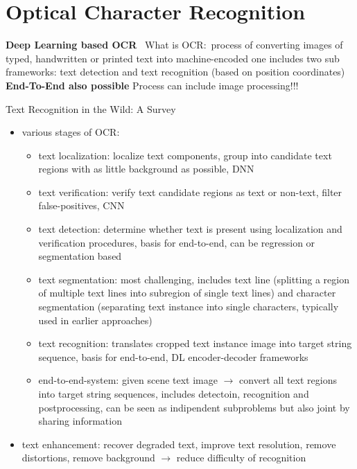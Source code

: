 \section{Optical Character Recognition}

\textbf{Deep Learning based OCR}~\citep{zhao_improving_2020}
What is OCR:\ process of converting images of typed, handwritten or printed text into machine-encoded one
includes two sub frameworks: text detection and text recognition (based on position coordinates)
\textbf{End-To-End also possible}
Process can include image processing!!!

Text Recognition in the Wild: A Survey~\citep{chen_text_2021}
\begin{itemize}
    \item various stages of \ac{OCR}:
        \begin{itemize}
            \item text localization: localize text components, group into candidate text regions with
                as little background as possible, DNN
            \item text verification: verify text candidate regions as text or non-text,
                filter false-positives, CNN
            \item text detection: determine whether text is present using localization and verification
                procedures, basis for end-to-end, can be regression or segmentation based
            \item text segmentation: most challenging, includes text line (splitting a region of multiple
                text lines into subregion of single text lines) and character segmentation (separating
                text instance into single characters, typically used in earlier approaches)
            \item text recognition: translates cropped text instance image into target string sequence,
                basis for end-to-end, DL encoder-decoder frameworks
            \item end-to-end-system: given scene text image $\rightarrow$ convert all text regions into
                target string sequences, includes detectoin, recognition and postprocessing, can be
                seen as indipendent subproblems but also joint by sharing information
        \end{itemize}
    \item text enhancement: recover degraded text, improve text resolution, remove distortions,
        remove background $\rightarrow$ reduce difficulty of recognition
\end{itemize}
